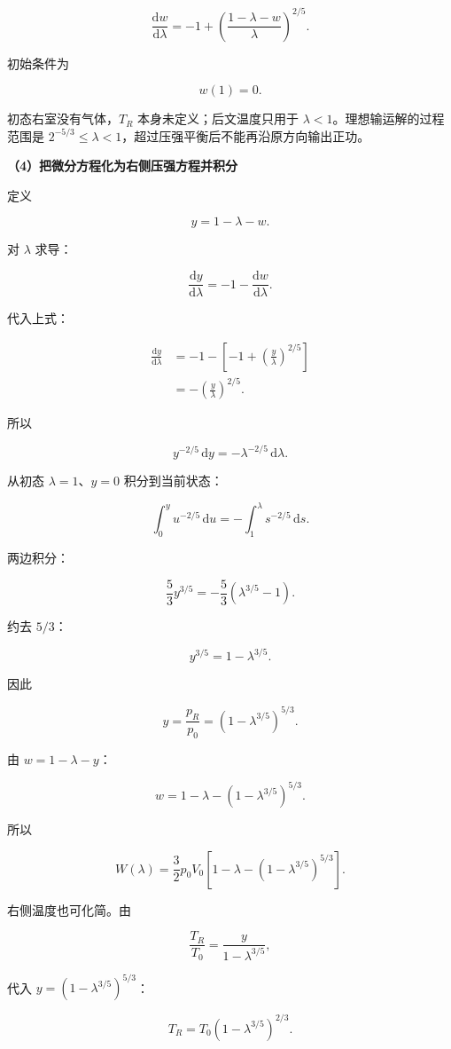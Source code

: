 \documentclass[12pt,a4paper,UTF8]{ctexart}
\begin{document}
\[
\boxed{
\frac{\mathrm{d}w}{\mathrm{d}\lambda}
=-1+\left(\frac{1-\lambda-w}{\lambda}\right)^{2/5}
}.
\]

初始条件为

\[w(1)=0.\]

初态右室没有气体，\(T_R\) 本身未定义；后文温度只用于
\(\lambda<1\)。理想输运解的过程范围是
\(2^{-5/3}\le\lambda<1\)，超过压强平衡后不能再沿原方向输出正功。

\textbf{（4）把微分方程化为右侧压强方程并积分}

定义

\[y=1-\lambda-w.\]

对 \(\lambda\) 求导：

\[
\frac{\mathrm{d}y}{\mathrm{d}\lambda}
=-1-\frac{\mathrm{d}w}{\mathrm{d}\lambda}.
\]

代入上式：

\[
\begin{aligned}
\frac{\mathrm{d}y}{\mathrm{d}\lambda}
&=-1-\left[-1+\left(\frac y\lambda\right)^{2/5}\right]\\
&=-\left(\frac y\lambda\right)^{2/5}.
\end{aligned}
\]

所以

\[
y^{-2/5}\,\mathrm{d}y=-\lambda^{-2/5}\,\mathrm{d}\lambda.
\]

从初态 \(\lambda=1\)、\(y=0\) 积分到当前状态：

\[
\int_0^y u^{-2/5}\,\mathrm{d}u
=-\int_1^\lambda s^{-2/5}\,\mathrm{d}s.
\]

两边积分：

\[
\frac53y^{3/5}
=-\frac53(\lambda^{3/5}-1).
\]

约去 \(5/3\)：

\[
y^{3/5}=1-\lambda^{3/5}.
\]

因此

\[
\boxed{
y=\frac{p_R}{p_0}
=\left(1-\lambda^{3/5}\right)^{5/3}
}.
\]

由 \(w=1-\lambda-y\)：

\[
\boxed{
w=1-\lambda-\left(1-\lambda^{3/5}\right)^{5/3}
}.
\]

所以

\[
\boxed{
W(\lambda)=\frac32p_0V_0
\left[
1-\lambda-\left(1-\lambda^{3/5}\right)^{5/3}
\right]
}.
\]

右侧温度也可化简。由

\[
\frac{T_R}{T_0}
=\frac{y}{1-\lambda^{3/5}},
\]

代入 \(y=(1-\lambda^{3/5})^{5/3}\)：

\[
\boxed{
T_R=T_0\left(1-\lambda^{3/5}\right)^{2/3}
}.
\]
\end{document}
